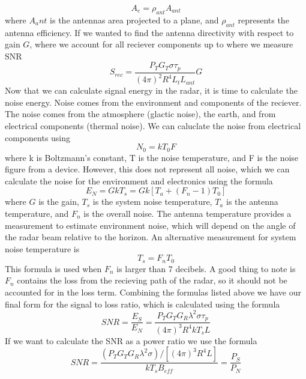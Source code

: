 \documentclass[12pt]{article}
\begin{document}
\begin{equation}
    A_{e} = \rho_{ant} A_{ant}
\end{equation}
where $A_ant$ is the antennas area projected to a plane, and $\rho_{ant}$ represents the antenna efficiency. If we wanted to find the antenna directivity with respect to gain $G$, where we account for all reciever components up to where we measure SNR
\begin{equation}
    S_{rec} = \frac{P_T G_T \sigma \tau_p}{(4 \pi)^2 R^4 L_t L_{ant}} G
\end{equation}
Now that we can calculate signal energy in the radar, it is time to calculate the noise energy. Noise comes from the environment and components of the reciever. The noise comes from the atmosphere (glactic noise), the earth, and from electrical components (thermal noise). We can caluclate the noise from electrical components using
\begin{equation}
    N_0 = kT_0F
\end{equation}
where k is Boltzmann's constant, T is the noise temperature, and F is the noise figure from a device. However, this does not represent all noise, which we can calculate the noise for the environment and electronics using the formula
\begin{equation}
    E_N =   GkT_s= Gk \left[ T_a + (F_n - 1) T_0\right]
\end{equation}
where $G$ is the gain, $T_s$ is the system noise temperature, $T_a$ is the antenna temperature, and $F_n$ is the overall noise. The antenna temperature provides a measurement to estimate environment noise, which will depend on the angle of the radar beam relative to the horizon. An alternative measurement for system noise temperature is 
\begin{equation}
    T_s = F_n T_0
\end{equation}
This formula is used when $F_n$ is larger than 7 decibels. A good thing to note is $F_n$ contains the loss from the recieving path of the radar, so it should not be accounted for in the loss term. Combining the formulas listed above we have our final form for the signal to loss ratio, which is calculated using the formula
\begin{equation}
    SNR = \frac{E_S}{E_N} = \frac{P_T G_T G_R \lambda^2 \sigma \tau_p}{ (4 \pi)^3 R^4 k T_s L }
\end{equation}
If we want to calculate the SNR as a power ratio we use the formula 
\begin{equation}
    SNR = \frac{ (P_T G_T G_R \lambda^2 \sigma) / \left[ (4 \pi)^3 R^4 L \right] }{k T_s B_{eff}} = \frac{P_S}{P_N}
\end{equation}
\end{document}

